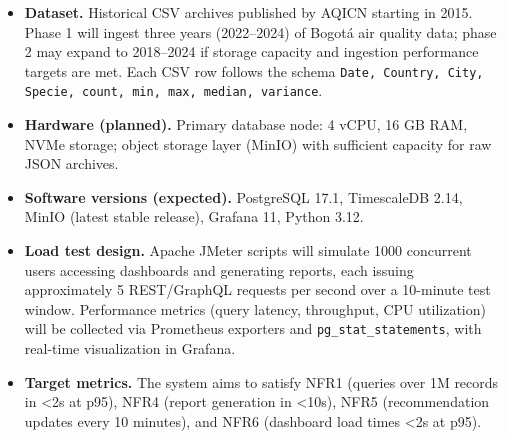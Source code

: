\begin{itemize}
  \item \textbf{Dataset.} Historical CSV archives published by AQICN starting in 2015\cite{aqicnhist}.  
        Phase 1 will ingest three years (2022–2024) of Bogotá air quality data; phase 2 may expand to 2018–2024 if storage capacity and ingestion performance targets are met.
        Each CSV row follows the schema \texttt{Date, Country, City, Specie, count, min, max, median, variance}.
  \item \textbf{Hardware (planned).} Primary database node: 4 vCPU, 16 GB RAM, NVMe storage; object storage layer (MinIO) with sufficient capacity for raw JSON archives.
  \item \textbf{Software versions (expected).} PostgreSQL 17.1, TimescaleDB 2.14, MinIO (latest stable release), Grafana 11, Python 3.12.
  \item \textbf{Load test design.} Apache JMeter scripts will simulate 1000 concurrent users accessing dashboards and generating reports, each issuing approximately 5 REST/GraphQL requests per second over a 10-minute test window\cite{jmeter}.  
        Performance metrics (query latency, throughput, CPU utilization) will be collected via Prometheus exporters and \texttt{pg\_stat\_statements}, with real-time visualization in Grafana\cite{grafana}.
  \item \textbf{Target metrics.} The system aims to satisfy NFR1 (queries over 1M records in <2s at p95), NFR4 (report generation in <10s), NFR5 (recommendation updates every 10 minutes), and NFR6 (dashboard load times <2s at p95).
\end{itemize}